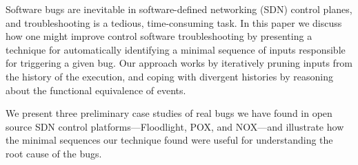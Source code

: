 Software bugs are inevitable in software-defined networking (SDN) control planes,
and troubleshooting
is a tedious, time-consuming task.
In this paper we discuss how one might improve
control software troubleshooting by presenting a technique
for automatically identifying
a minimal sequence of inputs responsible for triggering a given bug.
Our approach works by
iteratively pruning inputs from the history of the execution, and
coping with divergent histories by reasoning about the functional equivalence
of events.

We present three preliminary case studies of real bugs we have found in open source SDN control
platforms---Floodlight, POX, and NOX---and
illustrate how the minimal sequences our technique found were useful for
understanding the root cause of the bugs.
